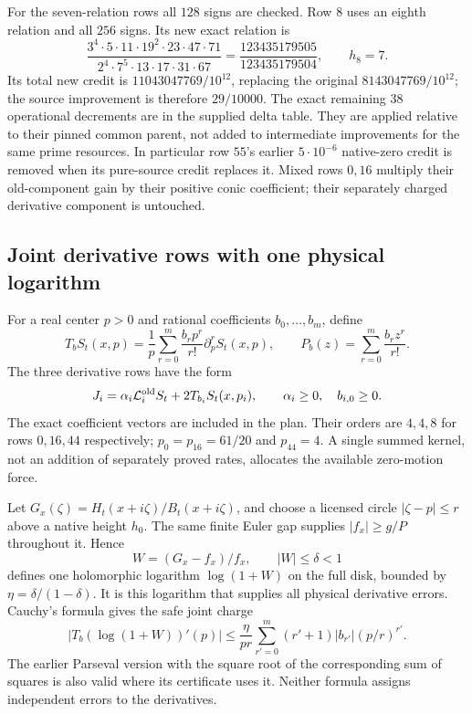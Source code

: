 \documentclass[11pt,a4paper]{article}
\theoremstyle{definition}
\theoremstyle{remark}
\begin{document}
For the seven-relation rows all $128$ signs are checked.  Row $8$ uses
an eighth relation and all $256$ signs.  Its new exact relation is
\[
 \frac{3^4\cdot5\cdot11\cdot19^2\cdot23\cdot47\cdot71}
      {2^4\cdot7^5\cdot13\cdot17\cdot31\cdot67}
       =\frac{123435179505}{123435179504},\qquad h_8=7.
\]
Its total new credit is $11043047769/10^{12}$, replacing the original
$8143047769/10^{12}$; the source improvement is therefore $29/10000$.
The exact remaining $38$ operational decrements are in the supplied
delta table.  They are applied relative to their pinned common parent,
not added to intermediate improvements for the same prime resources.
In particular row $55$'s earlier $5\cdot10^{-6}$ native-zero credit is
removed when its pure-source credit replaces it.  Mixed rows $0,16$
multiply their old-component gain by their positive conic coefficient;
their separately charged derivative component is untouched.

\subsection{Joint derivative rows with one physical logarithm}
\label{src:jets}

For a real center $p>0$ and rational coefficients $b_0,\ldots,b_m$, define
\begin{equation}
 T_bS_t(x,p)=\frac1p\sum_{r=0}^m\frac{b_rp^r}{r!}
                              \partial_p^r S_t(x,p),
 \qquad P_b(z)=\sum_{r=0}^m\frac{b_rz^r}{r!}.
 \label{src:jet-def}
\end{equation}
The three derivative rows have the form
\[
 J_i=\alpha_i\mathcal L_i^{\rm old}S_t+2T_{b_i}S_t(x,p_i),
 \qquad \alpha_i\geq0,\quad b_{i,0}\geq0.
\]
The exact coefficient vectors are included in the plan.  Their orders
are $4,4,8$ for rows $0,16,44$ respectively; $p_0=p_{16}=61/20$ and
$p_{44}=4$.  A single summed kernel, not an addition of separately
proved rates, allocates the available zero-motion force.

Let $G_x(\zeta)=H_t(x+i\zeta)/B_t(x+i\zeta)$, and choose a licensed
circle $|\zeta-p|\leq r$ above a native height $h_0$.  The same finite
Euler gap supplies $|f_x|\geq g/P$ throughout it.  Hence
\[
 W=(G_x-f_x)/f_x,\qquad |W|\leq\delta<1
\]
defines one holomorphic logarithm $\log(1+W)$ on the full disk, bounded
by $\eta=\delta/(1-\delta)$.  It is this logarithm that supplies all
physical derivative errors.  Cauchy's formula gives the safe joint
charge
\begin{equation}
 |T_b(\log(1+W))'(p)|
 \leq\frac{\eta}{pr}\sum_{r'=0}^m
          (r'+1)|b_{r'}|(p/r)^{r'}.
 \label{src:jet-physical}
\end{equation}
The earlier Parseval version with the square root of the corresponding
sum of squares is also valid where its certificate uses it.  Neither
formula assigns independent errors to the derivatives.
\end{document}
